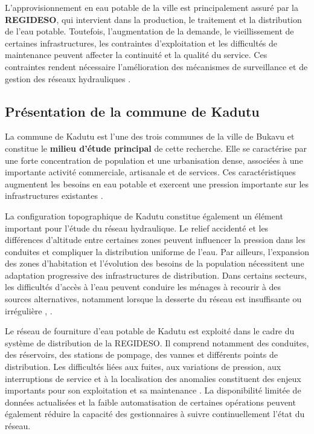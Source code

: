 L'approvisionnement en eau potable de la ville est principalement assuré
par la \textbf{REGIDESO}, qui intervient dans la production, le traitement
et la distribution de l'eau potable. Toutefois, l'augmentation de la
demande, le vieillissement de certaines infrastructures, les contraintes
d'exploitation et les difficultés de maintenance peuvent affecter la
continuité et la qualité du service. Ces contraintes rendent nécessaire
l'amélioration des mécanismes de surveillance et de gestion des réseaux
hydrauliques \cite{ref86}.

\subsection{Présentation de la commune de Kadutu}
\label{presentation-de-la-commune-de-kadutu}

La commune de Kadutu est l'une des trois communes de la ville de Bukavu
et constitue le \textbf{milieu d'étude principal} de cette recherche.
Elle se caractérise par une forte concentration de population et une
urbanisation dense, associées à une importante activité commerciale,
artisanale et de services. Ces caractéristiques augmentent les besoins
en eau potable et exercent une pression importante sur les infrastructures
existantes \cite{ref84}.

La configuration topographique de Kadutu constitue également un élément
important pour l'étude du réseau hydraulique. Le relief accidenté et les
différences d'altitude entre certaines zones peuvent influencer la
pression dans les conduites et compliquer la distribution uniforme de
l'eau. Par ailleurs, l'expansion des zones d'habitation et l'évolution
des besoins de la population nécessitent une adaptation progressive des
infrastructures de distribution. Dans certains secteurs, les difficultés
d'accès à l'eau peuvent conduire les ménages à recourir à des sources
alternatives, notamment lorsque la desserte du réseau est insuffisante
ou irrégulière \cite{ref82}, \cite{ref85}.

Le réseau de fourniture d'eau potable de Kadutu est exploité dans le
cadre du système de distribution de la REGIDESO. Il comprend notamment
des conduites, des réservoirs, des stations de pompage, des vannes et
différents points de distribution. Les difficultés liées aux fuites,
aux variations de pression, aux interruptions de service et à la
localisation des anomalies constituent des enjeux importants pour son
exploitation et sa maintenance \cite{ref86}. La disponibilité limitée
de données actualisées et la faible automatisation de certaines
opérations peuvent également réduire la capacité des gestionnaires à
suivre continuellement l'état du réseau.

